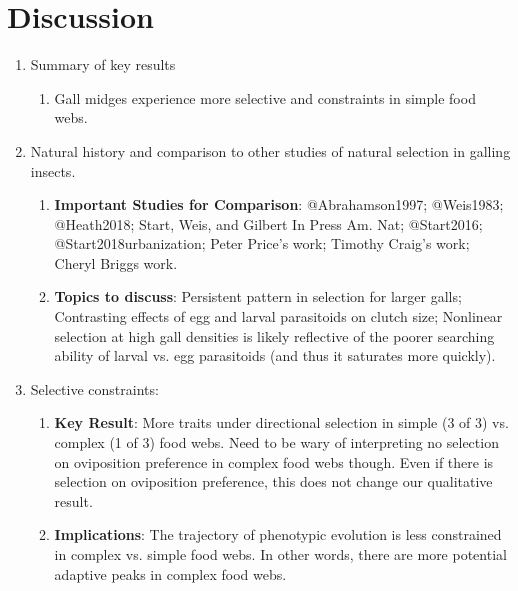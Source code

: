 \documentclass[11pt,]{article}
\begin{document}
\section{Discussion}\label{discussion}

\begin{enumerate}

 \item Summary of key results
    \begin{enumerate}
    \item Gall midges experience more selective and constraints in simple food webs.
    \end{enumerate}
 
 \item Natural history and comparison to other studies of natural selection in galling insects.
    \begin{enumerate}
    \item \textbf{Important Studies for Comparison}: @Abrahamson1997; @Weis1983; @Heath2018; Start, Weis, and Gilbert In Press Am. Nat; @Start2016; @Start2018urbanization; Peter Price's work; Timothy Craig's work; Cheryl Briggs work.
    \item \textbf{Topics to discuss}: Persistent pattern in selection for larger galls; Contrasting effects of egg and larval parasitoids on clutch size; Nonlinear selection at high gall densities is likely reflective of the poorer searching ability of larval vs. egg parasitoids (and thus it saturates more quickly).  
    \end{enumerate}
    
 \item Selective constraints:
    \begin{enumerate}
    \item \textbf{Key Result}: More traits under directional selection in simple (3 of 3) vs. complex (1 of 3) food webs. Need to be wary of interpreting no selection on oviposition preference in complex food webs though. Even if there is selection on oviposition preference, this does not change our qualitative result.
    \item \textbf{Implications}: The trajectory of phenotypic evolution is less constrained in complex vs. simple food webs. In other words, there are more potential adaptive peaks in complex food webs. 
    \end{enumerate}
    

\end{enumerate}
\end{document}
